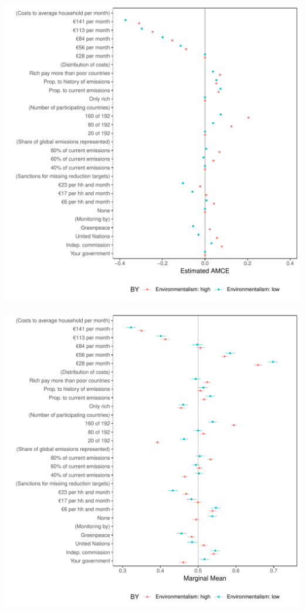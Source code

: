 \documentclass[a4paper,12pt]{article}\usepackage[]{graphicx}\usepackage[]{color}
\makeatletter
\def\maxwidth{ %
  \ifdim\Gin@nat@width>\linewidth
    \linewidth
  \else
    \Gin@nat@width
  \fi
}
\newenvironment{knitrout}{}{} %
\makeatother
\begin{document}
\begin{knitrout}
\color{fgcolor}
\includegraphics[width=\maxwidth]{figure/bechtel_subgroup_amce_environmentalism-1} 

\includegraphics[width=\maxwidth]{figure/bechtel_subgroup_amce_environmentalism-2} 

\end{knitrout}
\end{document}
